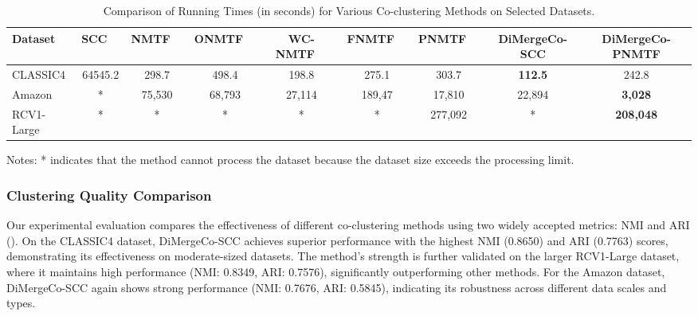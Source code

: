 \documentclass[journal]{IEEEtran}
\renewcommand{\cite}[1]{~\autocite{#1}}
\begin{document}
\begin{table}[htbp]
    \centering
    \caption{Comparison of Running Times (in seconds) for Various Co-clustering Methods on Selected Datasets.}
    \label{tab:running-time}
    \begin{tabular}{@{} l cccccccc @{}}
        \toprule
        Dataset    & SCC~\cite{dhillon2001CoclusteringDocumentsWords}
                   & NMTF~\cite{long2005CoclusteringBlockValue}
                   & ONMTF~\cite{ding2006OrthogonalNonnegativeMatrix}
                   & WC-NMTF~\cite{salah2018WordCooccurrenceRegularized}
                   & FNMTF~\cite{kim2011FastNonnegativeMatrix}
                   & PNMTF~\cite{chen2023ParallelNonNegativeMatrix}      & \textbf{DiMergeCo-SCC} & \textbf{DiMergeCo-PNMTF}                                                                 \\
        \midrule
        CLASSIC4   & 64545.2                                             & 298.7                  & 498.4                    & 198.8  & 275.1  & 303.7   & \textbf{112.5} & 242.8            \\
        Amazon     & *                                                   & 75,530                 & 68,793                   & 27,114 & 189,47 & 17,810  & 22,894         & \textbf{3,028}   \\
        RCV1-Large & *                                                   & *                      & *                        & *      & *      & 277,092 & *              & \textbf{208,048} \\
        \bottomrule
    \end{tabular}
    \begin{tablenotes}
        \small
        \item Notes: * indicates that the method cannot process the dataset because the dataset size exceeds the processing limit.
    \end{tablenotes}
\end{table}


\subsubsection{Clustering Quality Comparison}
Our experimental evaluation compares the effectiveness of different co-clustering methods using two widely accepted metrics: NMI and ARI (). On the CLASSIC4 dataset, DiMergeCo-SCC achieves superior performance with the highest NMI (0.8650) and ARI (0.7763) scores, demonstrating its effectiveness on moderate-sized datasets. The method's strength is further validated on the larger RCV1-Large dataset, where it maintains high performance (NMI: 0.8349, ARI: 0.7576), significantly outperforming other methods. For the Amazon dataset, DiMergeCo-SCC again shows strong performance (NMI: 0.7676, ARI: 0.5845), indicating its robustness across different data scales and types.
\end{document}
